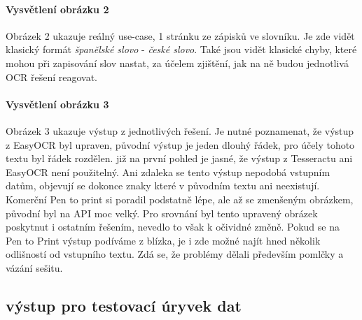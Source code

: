 \documentclass[journal]{IEEEtran}
\begin{document}
\paragraph{Vysvětlení obrázku 2}
Obrázek 2 ukazuje reálný use-case, 1 stránku ze zápisků ve slovníku.
Je zde vidět klasický formát \textit{španělské slovo} - \textit{české slovo}.
Také jsou vidět klasické chyby, které mohou při zapisování slov nastat, za účelem zjištění, jak na ně budou jednotlivá \ac{OCR} řešení reagovat.

\paragraph{Vysvětlení obrázku 3}
Obrázek 3 ukazuje výstup z jednotlivých řešení.
Je nutné poznamenat, že výstup z EasyOCR byl upraven, původní výstup je jeden dlouhý řádek, pro účely tohoto textu byl řádek rozdělen.
již na první pohled je jasné, že výstup z Tesseractu ani EasyOCR není použitelný.
Ani zdaleka se tento výstup nepodobá vstupním datům, objevují se dokonce znaky které v původním textu ani neexistují.
Komerční Pen to print si poradil podstatně lépe, ale až se zmenšeným obrázkem, původní byl na \ac{API} moc velký.
Pro srovnání byl tento upravený obrázek poskytnut i ostatním řešením, nevedlo to však k očividné změně.
Pokud se na Pen to Print výstup podíváme z blízka, je i zde možné najít hned několik odlišností od vstupního textu.
Zdá se, že problémy dělali především pomlčky a vázání sešitu.

\subsection{výstup pro testovací úryvek dat}
\end{document}

